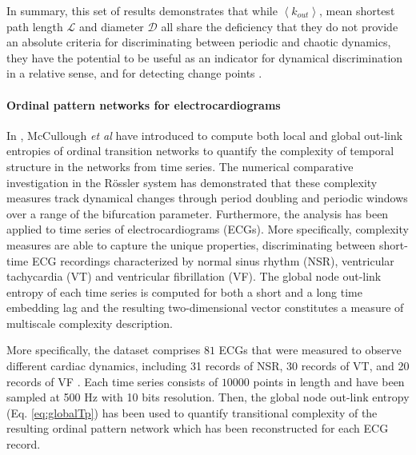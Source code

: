 	In summary, this set of results demonstrates that while $\left < k_{out} \right>$, mean shortest path length $\mathcal{L}$ and diameter $\mathcal{D}$ all share the deficiency that they do not provide an absolute criteria for discriminating between periodic and chaotic dynamics, they have the potential to be useful as an indicator for dynamical discrimination in a relative sense, and for detecting change points \cite{McCullough2015}.


	\paragraph{Ordinal pattern networks for electrocardiograms}
	In \cite{McCullough2017b}, McCullough {\textit{et al}} have introduced to compute both local and global out-link entropies of ordinal transition networks to quantify the complexity of temporal structure in the networks from time series. The numerical comparative investigation in the R\"ossler system has demonstrated that these complexity measures track dynamical changes through period doubling and periodic windows over a range of the bifurcation parameter. Furthermore, the analysis has been applied to time series of electrocardiograms (ECGs). More specifically, complexity measures are able to capture the unique properties, discriminating between short-time ECG recordings characterized by normal sinus rhythm (NSR), ventricular tachycardia (VT) and ventricular fibrillation (VF). The global node out-link entropy of each time series is computed for both a short and a long time embedding lag and the resulting two-dimensional vector constitutes a measure of multiscale complexity description.

	More specifically, the dataset comprises $81$ ECGs that were measured to observe different cardiac dynamics, including 31 records of NSR, 30 records of VT, and 20 records of VF \cite{McCullough2017b}. Each time series consists of $10000$ points in length and have been sampled at 500 Hz with 10 bits resolution. Then, the global node out-link entropy (Eq. \eqref{eq:globalTp}) has been used to quantify transitional complexity of the resulting ordinal pattern network which has been reconstructed for each ECG record.

